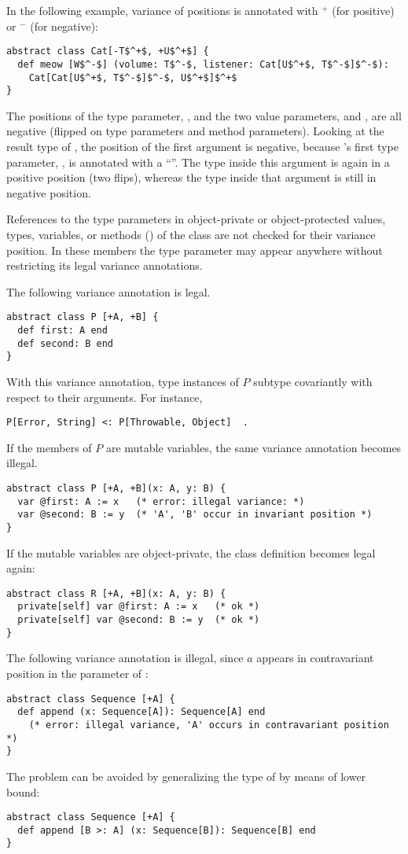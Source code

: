 \example In the following example, variance of positions is annotated with $^+$ (for positive) or $^-$ (for negative):
\begin{lstlisting}
abstract class Cat[-T$^+$, +U$^+$] {
  def meow [W$^-$] (volume: T$^-$, listener: Cat[U$^+$, T$^-$]$^-$):
    Cat[Cat[U$^+$, T$^-$]$^-$, U$^+$]$^+$
}
\end{lstlisting}
The positions of the type parameter, , and the two value parameters,  and , are all negative (flipped on type parameters and method parameters). Looking at the result type of , the position of the first  argument is negative, because 's first type parameter, , is annotated with a ``\code{-}''. The type  inside this argument is again in a positive position (two flips), whereas the type  inside that argument is still in negative position. 

References to the type parameters in object-private or object-protected values, types, variables, or methods () of the class are not checked for their variance position. In these members the type parameter may appear anywhere without restricting its legal variance annotations. 

\example The following variance annotation is legal. 
\begin{lstlisting}
abstract class P [+A, +B] {
  def first: A end
  def second: B end
}
\end{lstlisting}
With this variance annotation, type instances of $P$ subtype covariantly with respect to their arguments. For instance, 
\begin{lstlisting}
P[Error, String] <: P[Throwable, Object]  .
\end{lstlisting}
If the members of $P$ are mutable variables, the same variance annotation becomes illegal. 
\begin{lstlisting}
abstract class P [+A, +B](x: A, y: B) {
  var @first: A := x   (* error: illegal variance: *)
  var @second: B := y  (* 'A', 'B' occur in invariant position *)
}
\end{lstlisting}
If the mutable variables are object-private, the class definition becomes legal again: 
\begin{lstlisting}
abstract class R [+A, +B](x: A, y: B) {
  private[self] var @first: A := x   (* ok *)
  private[self] var @second: B := y  (* ok *)
}
\end{lstlisting}

\example The following variance annotation is illegal, since $a$ appears in contravariant position in the parameter of :
\begin{lstlisting}
abstract class Sequence [+A] {
  def append (x: Sequence[A]): Sequence[A] end
    (* error: illegal variance, 'A' occurs in contravariant position *)
}
\end{lstlisting}
The problem can be avoided by generalizing the type of  by means of lower bound:
\begin{lstlisting}
abstract class Sequence [+A] {
  def append [B >: A] (x: Sequence[B]): Sequence[B] end
}
\end{lstlisting}

